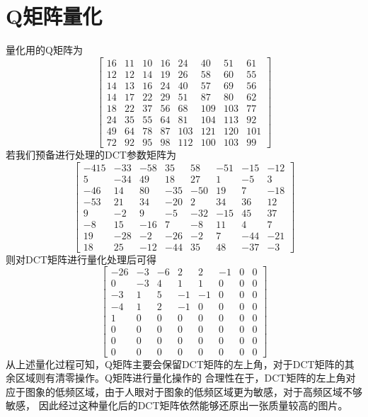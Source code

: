 \documentclass{ctexart}
\begin{document}
\section{Q矩阵量化}
量化用的Q矩阵为
\begin{equation}
\begin{bmatrix}
 16 & 11 & 10 & 16 & 24 & 40 & 51 & 61 \\
 12 & 12 & 14 & 19 & 26 & 58 & 60 & 55 \\
 14 & 13 & 16 & 24 & 40 & 57 & 69 & 56 \\
 14 & 17 & 22 & 29 & 51 & 87 & 80 & 62 \\
 18 & 22 & 37 & 56 & 68 & 109 & 103 & 77 \\
 24 & 35 & 55 & 64 & 81 & 104 & 113 & 92 \\
 49 & 64 & 78 & 87 & 103 & 121 & 120 & 101 \\
 72 & 92 & 95 & 98 & 112 & 100 & 103 & 99
\end{bmatrix}
\end{equation}
若我们预备进行处理的DCT参数矩阵为
\begin{equation}
\begin{bmatrix}
 -415 & -33 & -58 &  35 &  58 & -51 & -15 & -12 \\
    5 & -34 &  49 &  18 &  27 &   1 &  -5 &   3 \\
  -46 &  14 &  80 & -35 & -50 &  19 &   7 & -18 \\
  -53 &  21 &  34 & -20 &   2 &  34 &  36 &  12 \\
    9 &  -2 &   9 &  -5 & -32 & -15 &  45 &  37 \\
   -8 &  15 & -16 &   7 &  -8 &  11 &   4 &   7 \\
   19 & -28 &  -2 & -26 &  -2 &   7 & -44 & -21 \\
   18 &  25 & -12 & -44 &  35 &  48 & -37 & -3
\end{bmatrix}
\end{equation}
则对DCT矩阵进行量化处理后可得
\begin{equation}
\begin{bmatrix}
 -26 & -3 & -6 &  2 &  2 & -1 & 0 & 0 \\
   0 & -3 & 4 &  1 &  1 &  0 & 0 & 0 \\
  -3 &  1 &  5 & -1 & -1 &  0 & 0 & 0 \\
  -4 &  1 &  2 & -1 &  0 &  0 & 0 & 0 \\
   1 &  0 &  0 &  0 &  0 &  0 & 0 & 0 \\
   0 &  0 &  0 &  0 &  0 &  0 & 0 & 0 \\
   0 &  0 &  0 &  0 &  0 &  0 & 0 & 0 \\
   0 &  0 &  0 &  0 &  0 &  0 & 0 & 0
\end{bmatrix}
\end{equation}
从上述量化过程可知，Q矩阵主要会保留DCT矩阵的左上角，对于DCT矩阵的其余区域则有清零操作。Q矩阵进行量化操作的
合理性在于，DCT矩阵的左上角对应于图象的低频区域，由于人眼对于图象的低频区域更为敏感，对于高频区域不够敏感，
因此经过这种量化后的DCT矩阵依然能够还原出一张质量较高的图片。
\end{document}
